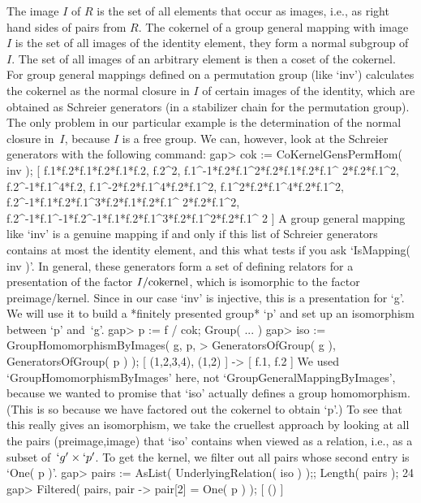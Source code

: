 The  image $I$ of $R$ is  the set of all   elements that occur as images,
i.e.,  as right hand sides of   pairs from $R$.   The cokernel of a group
general mapping with  image $I$ is the set  of all images of the identity
element, they form a normal subgroup of~$I$. The set of  all images of an
arbitrary  element  is then  a coset  of the cokernel.  For group general
mappings defined  on a permutation group  (like  `inv') {\GAP} calculates
the cokernel   as the normal   closure in $I$ of  certain  images  of the
identity,  which  are obtained as  Schreier  generators (in  a stabilizer
chain  for  the permutation group).  The  only problem  in our particular
example is the determination of the normal closure in~$I$, because $I$ is
a free group. We can,  however, look at  the Schreier generators with the
following command:
\beginexample
    gap> cok := CoKernelGensPermHom( inv );
    [ f.1*f.2*f.1*f.2*f.1*f.2, f.2^2, f.1^-1*f.2*f.1^2*f.2*f.1*f.2*f.1^
	2*f.2*f.1^2, f.2^-1*f.1^4*f.2, f.1^-2*f.2*f.1^4*f.2*f.1^2, 
      f.1^2*f.2*f.1^4*f.2*f.1^2, f.2^-1*f.1*f.2*f.1^3*f.2*f.1*f.2*f.1^
	2*f.2*f.1^2, f.2^-1*f.1^-1*f.2^-1*f.1*f.2*f.1^3*f.2*f.1^2*f.2*f.1^
	2 ]
\endexample
A  group general mapping like  `inv' is a genuine  mapping if and only if
this  list of Schreier generators contains  at most the identity element,
and this what {\GAP}  tests if you ask  `IsMapping(  inv )'. In  general,
these generators form  a set of defining  relators for a presentation  of
the factor  $I/\hbox{cokernel}$,    which is isomorphic  to   the  factor
preimage/kernel.  Since in our   case   `inv' is  injective,  this is   a
presentation for  `g'. We will  use it  to  build a  *finitely  presented
group* `p' and set up an isomorphism between `p' and~`g'.
\beginexample
    gap> p := f / cok;
    Group( ... )
    gap> iso := GroupHomomorphismByImages( g, p,
    >           GeneratorsOfGroup( g ), GeneratorsOfGroup( p ) );
    [ (1,2,3,4), (1,2) ] -> [ f.1, f.2 ]
\endexample
We       used      `GroupHomomorphismByImages'        here,           not
`GroupGeneralMappingByImages', because we  wanted to  promise {\GAP} that
`iso' actually defines a group homomorphism.  (This is so because we have
factored out  the cokernel to obtain `p'.)  To see that this really gives
an  isomorphism, we take  the  cruellest approach by  looking  at all the
pairs   (preimage,image) that `iso' contains  when  viewed as a relation,
i.e., as a subset  of~$`g'\times `p'$. To get the  kernel, we filter  out
all pairs whose second entry is `One( p )'.
\beginexample
    gap> pairs := AsList( UnderlyingRelation( iso ) );; Length( pairs );
    24
    gap> Filtered( pairs, pair -> pair[2] = One( p ) );
    [ () ]
\endexample

